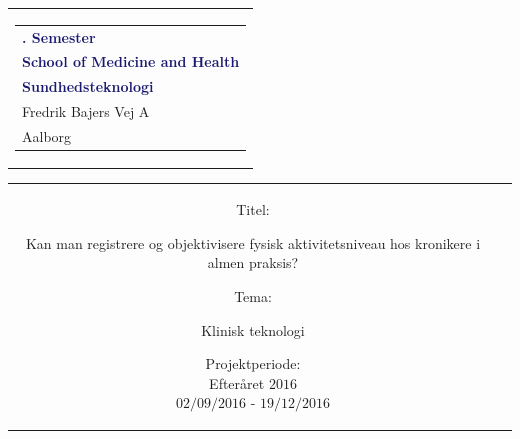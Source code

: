 % 
\thispagestyle{empty}
\begin{nopagebreak}
{\samepage 

\begin{tabular}{r}
\parbox{\textwidth}{  
\hfill \hspace{2cm} \parbox{8cm}{\begin{tabular}{l} %
{\small \textbf{\textcolor{MidnightBlue}{{$4$. Semester}}}}\\
{\small \textbf{\textcolor{MidnightBlue}{School of Medicine and Health}}}\\
{\small \textbf{\textcolor{MidnightBlue}{Sundhedsteknologi}}}\\
{\small \textcolor{NavyBlue}{Fredrik Bajers Vej $7$A}} \\
{\small \textcolor{NavyBlue}{$9220$ Aalborg}} \\
\end{tabular}}}
\end{tabular}

\begin{tabular}{cc}
\parbox{7cm}{
\begin{description}

\item {Titel:}

Kan man registrere og objektivisere fysisk aktivitetsniveau hos kronikere i almen praksis?\\

\item {Tema:} 

\small{
Klinisk teknologi
}

\end{description}

\parbox{8cm}{

\begin{description}
\item {Projektperiode:}\\
   Efteråret $2016$\\
   $02/09/2016$ - $19/12/2016$\\
   

\end{description}}}
\end{tabular}}
\end{nopagebreak}
